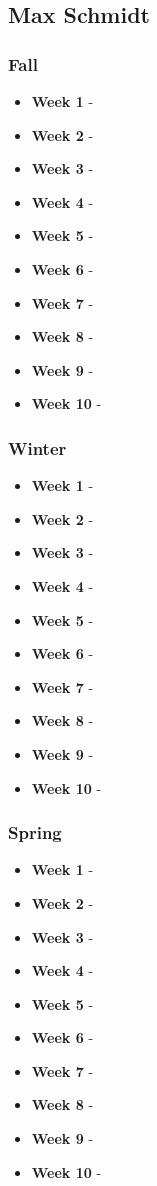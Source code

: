 \documentclass[onecolumn, draftclsnofoot,10pt, compsoc]{IEEEtran}
\begin{document}
		\subsection{Max Schmidt}
			\subsubsection{Fall}
				\begin{itemize}
					\item \textbf{Week 1} - 
					\item \textbf{Week 2} - 
					\item \textbf{Week 3} - 
					\item \textbf{Week 4} - 
					\item \textbf{Week 5} - 
					\item \textbf{Week 6} - 
					\item \textbf{Week 7} - 
					\item \textbf{Week 8} - 
					\item \textbf{Week 9} - 
					\item \textbf{Week 10} - 
				\end{itemize}
			\subsubsection{Winter}
				\begin{itemize}
					\item \textbf{Week 1} - 
					\item \textbf{Week 2} - 
					\item \textbf{Week 3} - 
					\item \textbf{Week 4} - 
					\item \textbf{Week 5} - 
					\item \textbf{Week 6} - 
					\item \textbf{Week 7} - 
					\item \textbf{Week 8} - 
					\item \textbf{Week 9} - 
					\item \textbf{Week 10} - 
				\end{itemize}
			\subsubsection{Spring}
				\begin{itemize}
					\item \textbf{Week 1} - 
					\item \textbf{Week 2} - 
					\item \textbf{Week 3} - 
					\item \textbf{Week 4} - 
					\item \textbf{Week 5} - 
					\item \textbf{Week 6} - 
					\item \textbf{Week 7} - 
					\item \textbf{Week 8} - 
					\item \textbf{Week 9} - 
					\item \textbf{Week 10} - 
				\end{itemize}
\end{document}
